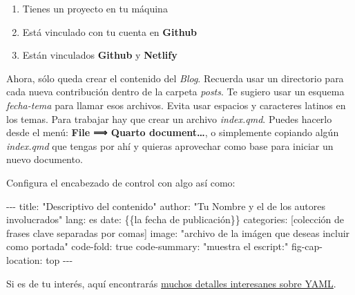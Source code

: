 \documentclass[
  spanish,
  letterpaper,
  DIV=11,
  numbers=noendperiod]{scrartcl}
\newenvironment{Shaded}{\begin{snugshade}}{\end{snugshade}}
\newcommand{\AnnotationTok}[1]{\textcolor[rgb]{0.37,0.37,0.37}{#1}}
\newcommand{\CommentTok}[1]{\textcolor[rgb]{0.37,0.37,0.37}{#1}}
\providecommand{\tightlist}{%
  \setlength{\itemsep}{0pt}\setlength{\parskip}{0pt}}
\begin{document}
\begin{tcolorbox}[enhanced jigsaw, rightrule=.15mm, toprule=.15mm, coltitle=black, opacitybacktitle=0.6, colframe=quarto-callout-note-color-frame, leftrule=.75mm, title=\textcolor{quarto-callout-note-color}{\faInfo}\hspace{0.5em}{Finalmente ¿Cómo quedá todo organizado?}, bottomtitle=1mm, toptitle=1mm, colbacktitle=quarto-callout-note-color!10!white, colback=white, breakable, opacityback=0, left=2mm, arc=.35mm, bottomrule=.15mm, titlerule=0mm]

\begin{enumerate}
\def\labelenumi{\arabic{enumi}.}
\tightlist
\item
  Tienes un proyecto en tu máquina
\item
  Está vinculado con tu cuenta en \textbf{Github}
\item
  Están vinculados \textbf{Github} y \textbf{Netlify}
\end{enumerate}

Ahora, sólo queda crear el contenido del \emph{Blog}. Recuerda usar un
directorio para cada nueva contribución dentro de la carpeta
\emph{posts}. Te sugiero usar un esquema \emph{fecha-tema} para llamar
esos archivos. Evita usar espacios y caracteres latinos en los temas.
Para trabajar hay que crear un archivo \emph{index.qmd}. Puedes hacerlo
desde el menú: \textbf{File ⟹ Quarto document\ldots{}}, o simplemente
copiando algún \emph{index.qmd} que tengas por ahí y quieras aprovechar
como base para iniciar un nuevo documento.

Configura el encabezado de control con algo así como:

\begin{Shaded}
\begin{Highlighting}[]
\CommentTok{{-}{-}{-}}
\AnnotationTok{title:}\CommentTok{ "Descriptivo del contenido"}
\AnnotationTok{author:}\CommentTok{ "Tu Nombre y el de los autores involucrados"}
\AnnotationTok{lang:}\CommentTok{ es }
\AnnotationTok{date:}\CommentTok{ \{\{la fecha de publicación\}\}}
\AnnotationTok{categories:}\CommentTok{ [colección de frases clave separadas por comas]}
\AnnotationTok{image:}\CommentTok{ "archivo de la imágen que deseas incluir como portada"}
\AnnotationTok{code{-}fold:}\CommentTok{ true}
\AnnotationTok{code{-}summary:}\CommentTok{ "muestra el escript:"}
\AnnotationTok{fig{-}cap{-}location:}\CommentTok{ top}
\CommentTok{{-}{-}{-}}
\end{Highlighting}
\end{Shaded}

Si es de tu interés, aquí encontrarás
\href{https://rpubs.com/drgregmartin/1266674}{muchos detalles
interesanes sobre YAML}.

\end{tcolorbox}
\end{document}
